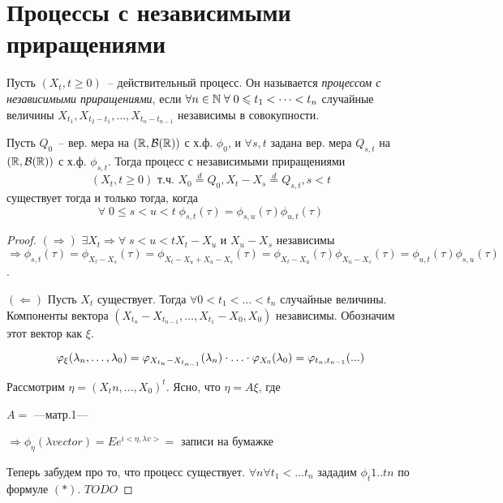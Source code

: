 \section{Процессы с независимыми приращениями}
\begin{definition}
Пусть $(X_t, t \geq 0)$~-- действительный процесс. Он называется \emph{процессом с
независимыми приращениями}, если $\forall n \in \mathbb{N} \; \forall \; 0 \leqslant t_1 < \dots < t_n$
случайные величины $X_{t_1}, X_{t_2 - t_1}, \dots, X_{t_n - t_{n-1}}$ независимы в совокупности.
\end{definition}

\begin{theorem}
Пусть $Q_0$~-- вер. мера на $(\mathbb{R}, \mathcal{B}(\mathbb{R}))$ с х.ф. $\phi_0$,
и $\forall s,t$ задана вер. мера $Q_{s,t}$ на $(\mathbb{R}, \mathcal{B}(\mathbb{R}))$ с х.ф. $\phi_{s,t}$.
Тогда процесс с независимыми приращениями
$$(X_t, t \geq 0) \text{ т.ч. } X_0 \overset{d}{=} Q_0, X_t - X_s \overset{d}{=} Q_{s,t}, s < t$$
существует тогда и только тогда, когда
$$\forall \; 0 \leq s < u < t \; \phi_{s,t}(\tau) = \phi_{s,u}(\tau) \phi_{u,t}(\tau)$$
\end{theorem}
\begin{proof} \forcenewline
$(\Rightarrow)$ $\exists X_t \Rightarrow \forall \; s < u < t X_t-X_u$ и
$X_u-X_s$ независимы $\Rightarrow \phi_{s,t}(\tau) = \phi_{X_t-X_s}(\tau)=
\phi_{X_t-X_u+X_u-X_s}(\tau) =
\phi_{X_t-X_u}(\tau) \phi_{X_u-X_s}(\tau) =
\phi_{u,t}(\tau) \phi_{s,u}(\tau)$.

$(\Leftarrow)$ Пусть $X_t$ существует. Тогда $\forall 0 < t_1 < \dots < t_n$
случайные величины. Компоненты вектора $(X_{t_n}-X_{t_{n-1}}, \dots, X_{t_1}-X_0, X_0)$
независимы. Обозначим этот вектор как $\xi$.

$$\varphi_\xi(\lambda_{n}, \dots, \lambda_{0}) =
\varphi_{X_{t_n}-X_{t_{n-1}}}(\lambda_n) \cdot \ldots \cdot \varphi_{X_0}(\lambda_0) =
\varphi_{t_n,t_{n-1}}(...)$$

Рассмотрим $\eta = (X_tn, ..., X_0)^t$. Ясно,  что $\eta = A\xi$, где

$A = $ ---матр.1---

$\Rightarrow \phi_\eta(\lambda vector) = Ee^{i <\eta, \lambda v>} = $
записи на бумажке

Теперь забудем про то, что процесс существует.
$\forall n \forall t_1 < ... t_n$ зададим $\phi_t1..tn$ по формуле $(*)$.
$TODO$
%
%
%
%
%
%
\end{proof}

